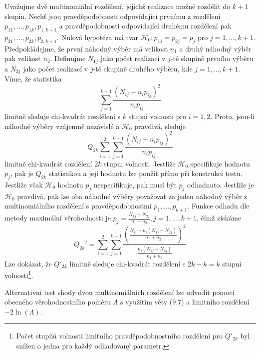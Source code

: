Uvažujme dvě multinomiální rozdělení, jejichž realizace možné rozdělit do $k + 1$ skupin. Nechť jsou pravděpodobnosti odpovídající prvnímu z rozdělení $p_{11}, ..., p_{1k}, p_{1,k+1}$ a pravděpodobnosti odpovídající druhému rozdělení pak $p_{21}, ..., p_{2k}, p_{2,k+1}$. Nulová hypotéza má tvar $\mathscr{H}_0: p_{1j} = p_{2j} = p_j$ pro $j = 1, ..., k + 1$. Předpokládejme, že první náhodný výběr má velikost $n_1$ a druhý náhodný výběr pak velikost $n_2$. Definujme $N_{1j}$ jako počet realizací v $j$-té skupině prvního výběru a $N_{2j}$ jako počet realizací v $j$-té skupině druhého výběru, kde $j = 1, ..., k + 1$. Víme, že statistika
\begin{equation*}
\sum_{j = 1}^{k + 1} \frac{(N_{ij} - n_i p_{ij})^2}{n_i p_{ij}}
\end{equation*}
limitně sleduje chi-kvadrát rozdělení s $k$ stupni volnosti pro $i = 1, 2$. Proto, jsou-li náhodné výběry vzájemně nezávislé a $\mathscr{H}_0$ pravdivá, sleduje
\begin{equation*}
Q_{2k}\sum_{i = 1}^2 \sum_{j = 1}^{k + 1} \frac{(N_{ij} - n_i p_{ij})^2}{n_i p_{ij}}
\end{equation*}
limitně chi-kvadrát rozdělení $2k$ stupni volnosti. Jestliže $\mathscr{H}_0$ specifikuje hodnotu $p_j$, pak je $Q_{2k}$ statistikou a její hodnotu lze použít přímo při konstrukci testu. Jestliže však $\mathscr{H}_0$ hodnotu $p_j$ nespecifikuje, pak musí být $p_j$ odhadnuto. Jestliže je $\mathscr{H}_0$ pravdivá, pak lze oba náhodné výběry považovat za jeden náhodný výběr z multinomiálního rozdělení s pravděpodobnostmi $p_1, ..., p_{k + 1}$. Funkce odhadu dle metody maximální věrohodnosti je $p_j = \frac{N_{1j} + N_{2j}}{n_1 + n_2}, j = 1, ..., k + 1$, čímž získáme
\begin{equation*}
Q_{2k}' = \sum_{i = 1}^2 \sum_{j = 1}^{k + 1} \frac{\left(\frac{N_{ij} - n_i(N_{1j} + N_{2j})}{n_1 + n_2}\right)^2}{\frac{n_i(N_{1j} + N_{2j})}{n_1 + n_2}}
\end{equation*}
Lze dokázat, že $Q'_{2k}$ limitně sleduje chi-kvadrát rozdělení s $2k - k = k$ stupni volnosti\footnote{Počet stupňů volnosti limitního pravděpodobnostního rozdělení pro $Q'_{2k}$ byl snížen o jedna pro každý odhadovaný parametr.}.

Alternativní test shody dvou multinomiálních rozdělení lze odvodit pomocí obecného věrohodnostního poměru $\Lambda$ s využitím věty (9.7) a limitního rozdělení $-2 \ln(\Lambda)$.

